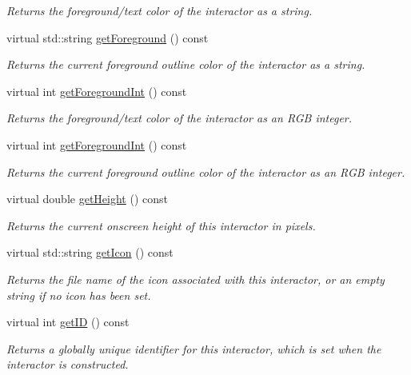 \begin{DoxyCompactItemize}
\begin{DoxyCompactList}\small\item\em Returns the foreground/text color of the interactor as a string. \end{DoxyCompactList}\item 
virtual std\+::string \mbox{\hyperlink{classsgl_1_1GDrawingSurface_a4fa2d8b0192a3a5b4af4bbfe71194d03}{get\+Foreground}} () const
\begin{DoxyCompactList}\small\item\em Returns the current foreground outline color of the interactor as a string. \end{DoxyCompactList}\item 
virtual int \mbox{\hyperlink{classsgl_1_1GInteractor_ac3b12ab385a6ef9ae90fc879860ba726}{get\+Foreground\+Int}} () const
\begin{DoxyCompactList}\small\item\em Returns the foreground/text color of the interactor as an R\+GB integer. \end{DoxyCompactList}\item 
virtual int \mbox{\hyperlink{classsgl_1_1GDrawingSurface_ac3b12ab385a6ef9ae90fc879860ba726}{get\+Foreground\+Int}} () const
\begin{DoxyCompactList}\small\item\em Returns the current foreground outline color of the interactor as an R\+GB integer. \end{DoxyCompactList}\item 
virtual double \mbox{\hyperlink{classsgl_1_1GInteractor_a1e7e353362434072875264cf95629f99}{get\+Height}} () const
\begin{DoxyCompactList}\small\item\em Returns the current onscreen height of this interactor in pixels. \end{DoxyCompactList}\item 
virtual std\+::string \mbox{\hyperlink{classsgl_1_1GInteractor_aaed62a73004939a64da6f0eb9eb64d73}{get\+Icon}} () const
\begin{DoxyCompactList}\small\item\em Returns the file name of the icon associated with this interactor, or an empty string if no icon has been set. \end{DoxyCompactList}\item 
virtual int \mbox{\hyperlink{classsgl_1_1GInteractor_a9c9659a6c6ba66b4107ba59c95a24241}{get\+ID}} () const
\begin{DoxyCompactList}\small\item\em Returns a globally unique identifier for this interactor, which is set when the interactor is constructed. \end{DoxyCompactList}\item 

\end{DoxyCompactItemize}
